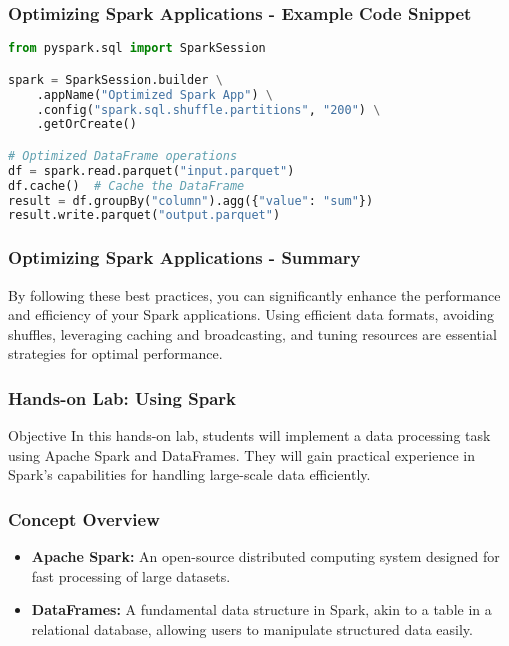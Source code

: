 \documentclass[aspectratio=169]{beamer}
\begin{document}
\begin{frame}[fragile]
  \frametitle{Optimizing Spark Applications - Example Code Snippet}
  \begin{lstlisting}[language=python]
from pyspark.sql import SparkSession

spark = SparkSession.builder \
    .appName("Optimized Spark App") \
    .config("spark.sql.shuffle.partitions", "200") \
    .getOrCreate()

# Optimized DataFrame operations
df = spark.read.parquet("input.parquet")
df.cache()  # Cache the DataFrame
result = df.groupBy("column").agg({"value": "sum"})
result.write.parquet("output.parquet")
  \end{lstlisting}
\end{frame}

\begin{frame}[fragile]
  \frametitle{Optimizing Spark Applications - Summary}
  By following these best practices, you can significantly enhance the performance and efficiency of your Spark applications. Using efficient data formats, avoiding shuffles, leveraging caching and broadcasting, and tuning resources are essential strategies for optimal performance.
\end{frame}

\begin{frame}
    \frametitle{Hands-on Lab: Using Spark}
    \begin{block}{Objective}
        In this hands-on lab, students will implement a data processing task using Apache Spark and DataFrames. They will gain practical experience in Spark's capabilities for handling large-scale data efficiently.
    \end{block}
\end{frame}

\begin{frame}
    \frametitle{Concept Overview}
    \begin{itemize}
        \item \textbf{Apache Spark:} An open-source distributed computing system designed for fast processing of large datasets.
        \item \textbf{DataFrames:} A fundamental data structure in Spark, akin to a table in a relational database, allowing users to manipulate structured data easily.
    \end{itemize}
\end{frame}
\end{document}
